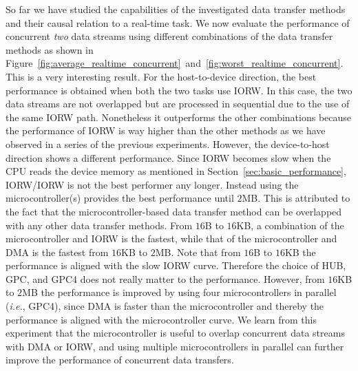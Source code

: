 So far we have studied the capabilities of the investigated data
transfer methods and their causal relation to a real-time task.
We now evaluate the performance of concurrent \textit{two} data streams
using different combinations of the data transfer methods as shown in
Figure~\ref{fig:average_realtime_concurrent}~and~\ref{fig:worst_realtime_concurrent}.
This is a very interesting result.
For the host-to-device direction, the best performance is obtained when
both the two tasks use \textsf{IORW}.
In this case, the two data streams are not overlapped but are processed
in sequential due to the use of the same \textsf{IORW} path.
Nonetheless it outperforms the other combinations because the
performance of \textsf{IORW} is way higher than the other methods as we
have observed in a series of the previous experiments.
However, the device-to-host direction shows a different performance.
Since \textsf{IORW} becomes slow when the CPU reads the device memory as
mentioned in Section~\ref{sec:basic_performance},
\textsf{IORW}/\textsf{IORW} is not the best performer any longer.
Instead using the microcontroller(s) provides the best performance until
$2$MB.
This is attributed to the fact that the microcontroller-based data
transfer method can be overlapped with any other data transfer methods.
From $16$B to $16$KB, a combination of the microcontroller and
\textsf{IORW} is the fastest, while that of the microcontroller and
\textsf{DMA} is the fastest from $16$KB to $2$MB.
Note that from $16$B to $16$KB the performance is aligned with the slow
\textsf{IORW} curve.
Therefore the choice of \textsf{HUB}, \textsf{GPC}, and \textsf{GPC4}
does not really matter to the performance.
However, from $16$KB to $2$MB the performance is improved by using four
microcontrollers in parallel (\textit{i.e.}, \textsf{GPC4}), since
\textsf{DMA} is faster than the microcontroller and
thereby the performance is aligned with the microcontroller curve.
We learn from this experiment that the microcontroller is useful to
overlap concurrent data streams with \textsf{DMA} or \textsf{IORW}, and
using multiple microcontrollers in parallel can further improve the
performance of concurrent data transfers.

